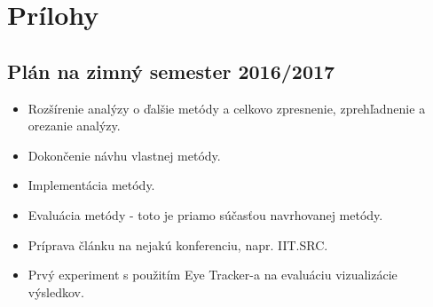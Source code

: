 \label{app.01}
\appendix
\chapter*{Prílohy}
\renewcommand{\thesection}{\Alph{section}}


\section{Plán na zimný semester 2016/2017}\label{plan}
\begin{itemize}
	\item Rozšírenie analýzy o ďalšie metódy a celkovo zpresnenie, zprehľadnenie a orezanie analýzy.
	\item Dokončenie návhu vlastnej metódy.
	\item Implementácia metódy.
	\item Evaluácia metódy - toto je priamo súčasťou navrhovanej metódy.
	\item Príprava článku na nejakú konferenciu, napr. IIT.SRC.
	\item Prvý experiment s použitím Eye Tracker-a na evaluáciu vizualizácie výsledkov.
\end{itemize}